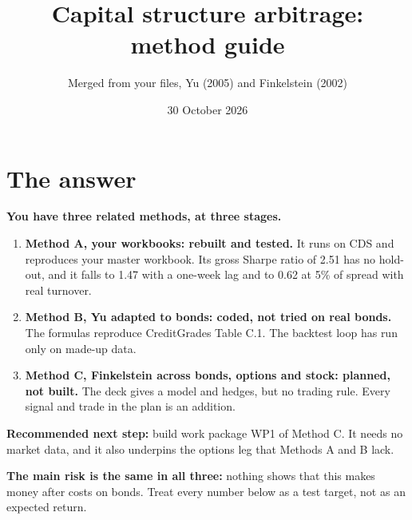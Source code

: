 \documentclass[10pt,a4paper]{article}
\title{Capital structure arbitrage: method guide}
\author{Merged from your files, Yu (2005) and Finkelstein (2002)}
\date{30 October 2026}
\begin{document}
\maketitle

\section*{The answer}
\textbf{You have three related methods, at three stages.}
\begin{enumerate}[leftmargin=*,itemsep=2pt]
\item \textbf{Method A, your workbooks: rebuilt and tested.} It runs on CDS and reproduces your master workbook. Its gross Sharpe ratio of 2.51 has no hold-out, and it falls to 1.47 with a one-week lag and to 0.62 at 5\% of spread with real turnover.
\item \textbf{Method B, Yu adapted to bonds: coded, not tried on real bonds.} The formulas reproduce CreditGrades Table C.1. The backtest loop has run only on made-up data.
\item \textbf{Method C, Finkelstein across bonds, options and stock: planned, not built.} The deck gives a model and hedges, but no trading rule. Every signal and trade in the plan is an addition.
\end{enumerate}
\textbf{Recommended next step:} build work package WP1 of Method C. It needs no market data, and it also underpins the options leg that Methods A and B lack.

\textbf{The main risk is the same in all three:} nothing shows that this makes money after costs on bonds. Treat every number below as a test target, not as an expected return.
\end{document}
